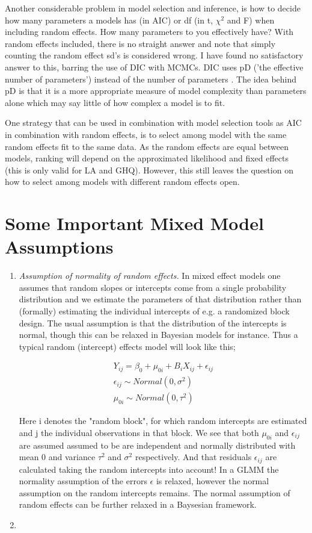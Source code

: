 \documentclass{article}\usepackage[]{graphicx}\usepackage[]{color}
\numberwithin{equation}{section} %
\numberwithin{figure}{section} %
\numberwithin{table}{section} %
\begin{document}
Another considerable problem in model selection and inference, is how to decide how many parameters a models has (in AIC) or df (in t, $\chi^2$ and F) when including random effects. How many parameters to you effectively have? With random effects included, there is no straight answer and note that simply counting the random effect sd's is considered wrong. I have found no satisfactory answer to this, barring the use of DIC with MCMCs. DIC uses pD ('the effective number of parameters') instead of the number of parameters \citep{Spiegelhalter2002}. The idea behind pD is that it is a more appropriate measure of model complexity than parameters alone which may say little of how complex a model is to fit.  

One strategy that can be used in combination with model selection tools as AIC in combination with random effects, is to select among model with the same random effects fit to the same data. As the random effects are equal between models, ranking will depend on the approximated likelihood and fixed effects (this is only valid for LA and GHQ). However, this still leaves the question on how to select among models with different random effects open.


\section{Some Important Mixed Model Assumptions}
\begin{enumerate}
\item \textit{Assumption of normality of random effects.} In mixed effect models one assumes that random slopes or intercepts come from a single probability distribution and we estimate the parameters of that distribution rather than (formally) estimating the individual intercepts of e.g. a randomized block design. The usual assumption is that the distribution of the intercepts is normal, though this can be relaxed in Bayesian models for instance. Thus a typical random (intercept) effects model will look like this;

\begin{equation}
\begin{split}
Y_{ij}  = \beta_{0}+\mu_{0i}+B_i X_{ij} + \epsilon_{ij} \\
\epsilon_{ij} \sim Normal(0,\sigma^2) \\
\mu_{0i} \sim Normal(0,\tau^2)
\end{split}
\end{equation}

Here i denotes the "random block", for which random intercepts are estimated and j the individual observations in that block. We see that both $\mu_{0i}$ and $\epsilon_{ij}$ are assumed assumed to be are independent and normally distributed with mean 0 and variance $\tau^2$ and $\sigma^2$ respectively. And that residuals $\epsilon_{ij}$ are calculated taking the random intercepts into account! In a GLMM the normality assumption of the errors $\epsilon$ is relaxed, however the normal assumption on the random intercepts remains. The normal assumption of random effects can be further relaxed in a Baysesian framework.

\item 
\end{enumerate}
\end{document}
